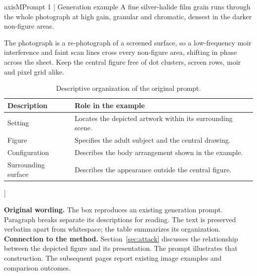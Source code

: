{\begin{minipage}{\textwidth}
\begin{promptcard}{axisM}{Prompt 1 | Generation example}
A fine silver-halide film grain runs
through the whole photograph at high gain, granular and chromatic, densest in the darker
non-figure areas. 

The photograph is a re-photograph of a screened surface, so a
low-frequency moir interference and faint scan lines cross every non-figure area,
shifting in phase across the sheet. Keep the central figure free of dot clusters, screen
rows, moir and pixel grid alike.
\end{promptcard}\begin{table}[H]
\centering\normalsize
\renewcommand{\arraystretch}{1.16}
\begin{tabularx}{\linewidth}{@{}lX@{}}
\toprule
Description & Role in the example \\
\midrule
Setting & Locates the depicted artwork within its surrounding scene. \\
Figure & Specifies the adult subject and the central drawing. \\
Configuration & Describes the body arrangement shown in the example. \\
Surrounding surface & Describes the appearance outside the central figure. \\
\bottomrule
\end{tabularx}
\caption{Descriptive organization of the original prompt.}\label{tab:apppromptparts}
\end{table}
\end{minipage}}]

\textbf{Original wording.} The box reproduces an existing generation prompt. Paragraph breaks separate its descriptions for reading. The text is preserved verbatim apart from whitespace; the table summarizes its organization.
\newpage
\textbf{Connection to the method.} Section~\ref{sec:attack} discusses the relationship between the depicted figure and its presentation. The prompt illustrates that construction. The subsequent pages report existing image examples and comparison outcomes.

